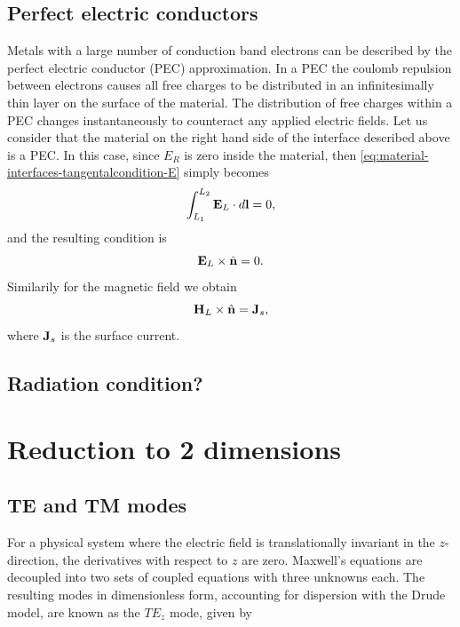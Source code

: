 \subsection{Perfect electric conductors}

Metals with a large number of conduction band electrons can be described by the perfect electric conductor (PEC) approximation. In a PEC the coulomb repulsion between electrons causes all free charges to be distributed in an infinitesimally thin layer on the surface of the material. The distribution of free charges within a PEC changes instantaneously to counteract any applied electric fields. Let us consider that the material on the right hand side of the interface described above is a PEC. In this case, since $E_R$ is zero inside the material, then \eqref{eq:material-interfaces-tangentalcondition-E} simply becomes
$$
\int_{L_1}^{L_2} \mathbf{E}_L \cdot d\mathbf{l} = 0 ,
$$
and the resulting condition is
$$
\mathbf{E}_L \times \hat{\mathbf{n}} = 0 .
$$
Similarily for the magnetic field we obtain
$$
\mathbf{H}_L \times \hat{\mathbf{n}} = \mathbf{J}_s ,
$$
where $\mathbf{J}_s$ is the surface current.

\subsection{Radiation condition?}

\section{Reduction to 2 dimensions}

\subsection{TE and TM modes}
For a physical system where the electric field is translationally invariant in the $z$-direction, the derivatives with respect to $z$ are zero. Maxwell's equations are decoupled into two sets of coupled equations with three unknowns each. The resulting modes in dimensionless form, accounting for dispersion with the Drude model, are known as the $TE_z$ mode, given by

